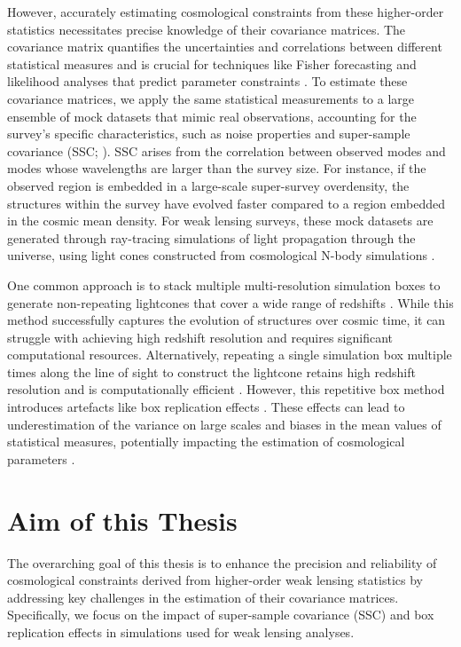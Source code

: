 However, accurately estimating cosmological constraints from these higher-order statistics necessitates precise knowledge of their covariance matrices. The covariance matrix quantifies the uncertainties and correlations between different statistical measures and is crucial for techniques like Fisher forecasting and likelihood analyses that predict parameter constraints \citep{1997PhRvL..79.3806T}. To estimate these covariance matrices, we apply the same statistical measurements to a large ensemble of mock datasets that mimic real observations, accounting for the survey's specific characteristics, such as noise properties \citep{2019MNRAS.490.2606W} and super-sample covariance (SSC; \citealt{PhysRevD.87.123504}). SSC arises from the correlation between observed modes and modes whose wavelengths are larger than the survey size. For instance, if the observed region is embedded in a large-scale super-survey overdensity, the structures within the survey have evolved faster compared to a region embedded in the cosmic mean density. For weak lensing surveys, these mock datasets are generated through ray-tracing simulations of light propagation through the universe, using light cones constructed from cosmological N-body simulations \citep{2019MNRAS.486...52S, 2024arXiv240513495E}.

One common approach is to stack multiple multi-resolution simulation boxes to generate non-repeating lightcones that cover a wide range of redshifts \citep{2015MNRAS.448.2987F, 2015MNRAS.453.1513C, 2017ApJ...850...24T, 2019ApJ...875...69D}. While this method successfully captures the evolution of structures over cosmic time, it can struggle with achieving high redshift resolution and requires significant computational resources. Alternatively, repeating a single simulation box multiple times along the line of sight to construct the lightcone retains high redshift resolution and is computationally efficient \citep{2010ApJ...709..920S, 2018JCAP...03..049L, 2020JCAP...10..012S, 2024MNRAS.530.5030O}. However, this repetitive box method introduces artefacts like box replication effects \citep{2024MNRAS.534.1205C}. These effects can lead to underestimation of the variance on large scales and biases in the mean values of statistical measures, potentially impacting the estimation of cosmological parameters \citep{2021JCAP...01..028Z}.

\section{Aim of this Thesis}
The overarching goal of this thesis is to enhance the precision and reliability of cosmological constraints derived from higher-order weak lensing statistics by addressing key challenges in the estimation of their covariance matrices. Specifically, we focus on the impact of super-sample covariance (SSC) and box replication effects in simulations used for weak lensing analyses.

